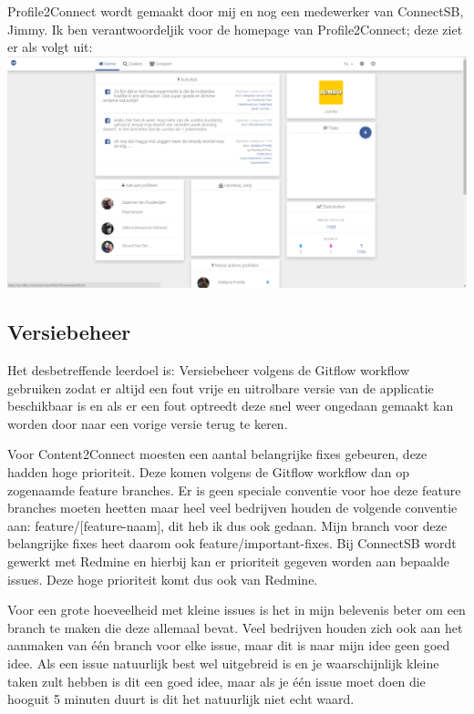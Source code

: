 \newline

Profile2Connect wordt gemaakt door mij en nog een medewerker van ConnectSB, Jimmy. Ik ben verantwoordeljik voor de homepage van Profile2Connect; deze ziet er als volgt uit:
\includegraphics[scale=0.5]{profile2connect}


\subsection{Versiebeheer}
Het desbetreffende leerdoel is: Versiebeheer volgens de Gitflow workflow gebruiken zodat er altijd een fout vrije en uitrolbare versie van de applicatie beschikbaar is en als er een fout optreedt deze snel weer ongedaan gemaakt kan worden door naar een vorige versie terug te keren.

\newline

Voor Content2Connect moesten een aantal belangrijke fixes gebeuren, deze hadden hoge prioriteit. Deze komen volgens de Gitflow workflow dan op zogenaamde feature branches. Er is geen speciale conventie voor hoe deze feature branches moeten heetten maar heel veel bedrijven houden de volgende conventie aan: feature/[feature-naam], dit heb ik dus ook gedaan. Mijn branch voor deze belangrijke fixes heet daarom ook feature/important-fixes. Bij ConnectSB wordt gewerkt met Redmine en hierbij kan er prioriteit gegeven worden aan bepaalde issues. Deze hoge prioriteit komt dus ook van Redmine.

Voor een grote hoeveelheid met kleine issues is het in mijn belevenis beter om een branch te maken die deze allemaal bevat. Veel bedrijven houden zich ook aan het aanmaken van één branch voor elke issue, maar dit is naar mijn idee geen goed idee. Als een issue natuurlijk best wel uitgebreid is en je waarschijnlijk kleine taken zult hebben is dit een goed idee, maar als je één issue moet doen die hooguit 5 minuten duurt is dit het natuurlijk niet echt waard.

